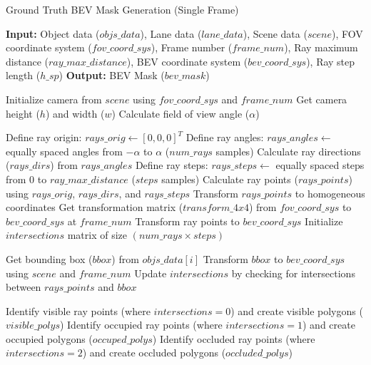 \begin{algorithm}
    \caption{Ground Truth BEV Mask Generation (Single Frame)}
    \label{algorithm:gt_bev_mask}
    \footnotesize

    \begin{algorithmic}[1]
        \State \textbf{Input:} Object data ($objs\_data$), Lane data ($lane\_data$), Scene data ($scene$), FOV coordinate system ($fov\_coord\_sys$), Frame number ($frame\_num$), Ray maximum distance ($ray\_max\_distance$), BEV coordinate system ($bev\_coord\_sys$), Ray step length ($h\_sp$)
        \State \textbf{Output:} BEV Mask ($bev\_mask$)

        \State Initialize camera from $scene$ using $fov\_coord\_sys$ and $frame\_num$
        \State Get camera height ($h$) and width ($w$)
        \State Calculate field of view angle ($\alpha$)

        \State Define ray origin: $rays\_orig \gets [0, 0, 0]^T$
        \State Define ray angles: $rays\_angles \gets$ equally spaced angles from $-\alpha$ to $\alpha$ ($num\_rays$ samples)
        \State Calculate ray directions ($rays\_dirs$) from $rays\_angles$
        \State Define ray steps: $rays\_steps \gets$ equally spaced steps from 0 to $ray\_max\_distance$ ($steps$ samples)
        \State Calculate ray points ($rays\_points$) using $rays\_orig$, $rays\_dirs$, and $rays\_steps$
        \State Transform $rays\_points$ to homogeneous coordinates
        \State Get transformation matrix ($transform\_4x4$) from $fov\_coord\_sys$ to $bev\_coord\_sys$ at $frame\_num$
        \State Transform ray points to $bev\_coord\_sys$
        \State Initialize $intersections$ matrix of size $(num\_rays \times steps)$

          
            \State Get bounding box ($bbox$) from $objs\_data[i]$
                \State Transform $bbox$ to $bev\_coord\_sys$ using $scene$ and $frame\_num$
            \EndIf
            \State Update $intersections$ by checking for intersections between $rays\_points$ and $bbox$  
        \EndFor

        \State Identify visible ray points (where $intersections = 0$) and create visible polygons ($visible\_polys$) 
        \State Identify occupied ray points (where $intersections = 1$) and create occupied polygons ($occuped\_polys$) 
        \State Identify occluded ray points (where $intersections = 2$) and create occluded polygons ($occluded\_polys$) 


\end{algorithmic}
\end{algorithm}
